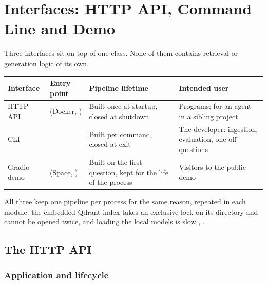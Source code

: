 \chapter{Interfaces: HTTP API, Command Line and Demo}
\label{ch:interfaces}

Three interfaces sit on top of one  class. None of them contains retrieval or generation logic of its own.

\begin{center}
\begin{tabularx}{\textwidth}{@{}>{\raggedright\arraybackslash}p{2.3cm}>{\raggedright\arraybackslash}p{3.6cm}>{\raggedright\arraybackslash}p{4.4cm}L@{}}
\toprule
\textbf{Interface} & \textbf{Entry point} & \textbf{Pipeline lifetime} & \textbf{Intended user}\\
\midrule
HTTP API &  (Docker, ) & Built once at startup, closed at shutdown & Programs;  for an agent in a sibling project\\
CLI &  & Built per command, closed at exit & The developer: ingestion, evaluation, one-off questions\\
Gradio demo &  (Space, ) & Built on the first question, kept for the life of the process & Visitors to the public demo\\
\bottomrule
\end{tabularx}
\end{center}

All three keep one pipeline per process for the same reason, repeated in each module: the embedded Qdrant index takes an exclusive lock on its directory and cannot be opened twice, and loading the local models is slow , .

\section{The HTTP API}
\label{sec:api}

\subsection{Application and lifecycle}

